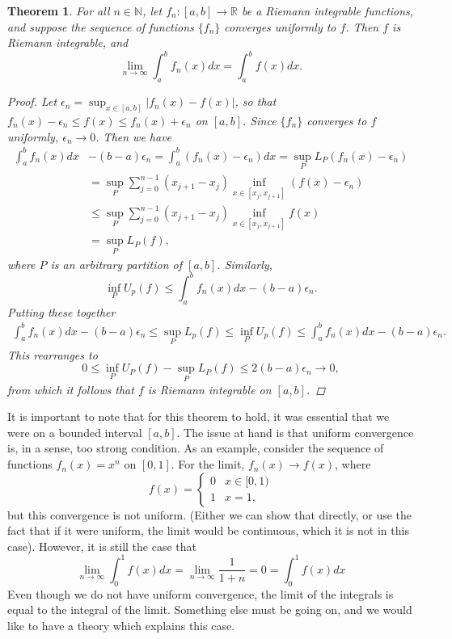 \documentclass[12pt]{amsart}         %
\newtheorem{theorem}{Theorem}[section]
\theoremstyle{remark}
\newcommand{\N}{\mathbb{N}}
\newcommand{\R}{\mathbb{R}}
\begin{document}
\begin{itemize}
    \begin{theorem}
    For all $n \in \N$, let $f_n: [a, b] \rightarrow \R$ be a Riemann integrable functions, and suppose the sequence of functions $\{f_n\}$ converges uniformly to $f$. Then $f$ is Riemann integrable, and
     \[
    \lim_{n\rightarrow\infty}\int_a^b f_n(x) dx = \int_a^b f(x) dx.
    \]
    \begin{proof}
    Let $\epsilon_n = \sup_{x \in [a, b]}|f_n(x) - f(x)|$, so that $f_n(x) - \epsilon_n \leq f(x) \leq f_n(x) + \epsilon_n$ on $[a, b]$. Since $\{f_n\}$ converges to $f$ uniformly, $\epsilon_n \rightarrow 0$. Then we have
    \begin{align*}
    \int_a^b f_n(x) dx &- (b-a)\epsilon_n = 
    \int_a^b (f_n(x) - \epsilon_n) dx = \sup_P L_P(f_n(x) -\epsilon_n) \\
    &= \sup_P \sum_{j = 0}^{n-1} (x_{j+1} - x_j) \inf_{x \in [x_j, x_{j+1}]} (f(x) - \epsilon_n) \\
    &\leq \sup_P \sum_{j = 0}^{n-1} (x_{j+1} - x_j) \inf_{x \in [x_j, x_{j+1}]} f(x) \\
    &= \sup_P L_P(f),
    \end{align*}
    where $P$ is an arbitrary partition of $[a,b]$. Similarly,
    \[
    \inf_P U_p(f) \leq \int_a^b f_n(x) dx - (b-a)\epsilon_n.
    \]
    Putting these together
    \begin{align*}
    \int_a^b f_n(x) dx - (b-a)\epsilon_n \leq \sup_P L_p(f) \leq \inf_P U_p(f) \leq \int_a^b f_n(x) dx - (b-a)\epsilon_n.
    \end{align*}
    This rearranges to
    \[
    0 \leq \inf_P U_P(f) - \sup_P L_P(f) \leq 2(b-a)\epsilon_n \rightarrow 0,
    \]
    from which it follows that $f$ is Riemann integrable on $[a,b]$.
    \end{proof}
    \end{theorem}
    It is important to note that for this theorem to hold, it was essential that we were on a bounded interval $[a,b]$. The issue at hand is that uniform convergence is, in a sense, too strong condition. As an example, consider the sequence of functions $f_n(x) = x^n$ on $[0, 1]$. For the limit, $f_n(x) \rightarrow f(x)$, where
    \[
    f(x) = \begin{cases}
    0 & x \in [0, 1) \\
    1 & x = 1,
    \end{cases}
    \]
    but this convergence is not uniform. (Either we can show that directly, or use the fact that if it were uniform, the limit would be continuous, which it is not in this case). However, it is still the case that
    \[
    \lim_{n \rightarrow \infty} \int_0^1 f(x) dx = \lim_{n \rightarrow \infty} \frac{1}{1+n} = 0 = \int_0^1 f(x) dx
    \]
    Even though we do not have uniform convergence, the limit of the integrals is equal to the integral of the limit. Something else must be going on, and we would like to have a theory which explains this case.
\end{itemize}
\end{document}
